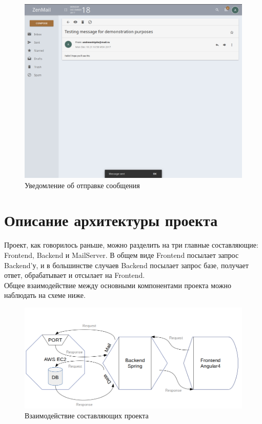 \documentclass{article}
\begin{document}
\begin{figure}[H]
        \begin{flushleft}        \centerline{\includegraphics[scale=0.6]{messagesent.png}}
        \caption{Уведомление об отправке сообщения}
        \end{flushleft}
\end{figure}

\newpage

\section{Описание архитектуры проекта}
Проект, как говорилось раньше, можно разделить на три главные составляющие: Frontend, Backend и MailServer. В общем виде Frontend посылает запрос Backend'у, и в большинстве случаев Backend посылает запрос базе, получает ответ, обрабатывает и отсылает на Frontend. \\
Общее взаимодействие между основными компонентами проекта можно наблюдать на схеме ниже. 

\begin{figure}[H]
        \begin{flushleft}        \centerline{\includegraphics[scale=0.6]{basicscheme.png}}
        \caption{Взаимодействие составляющих проекта}
        \end{flushleft}
\end{figure}
\end{document}
